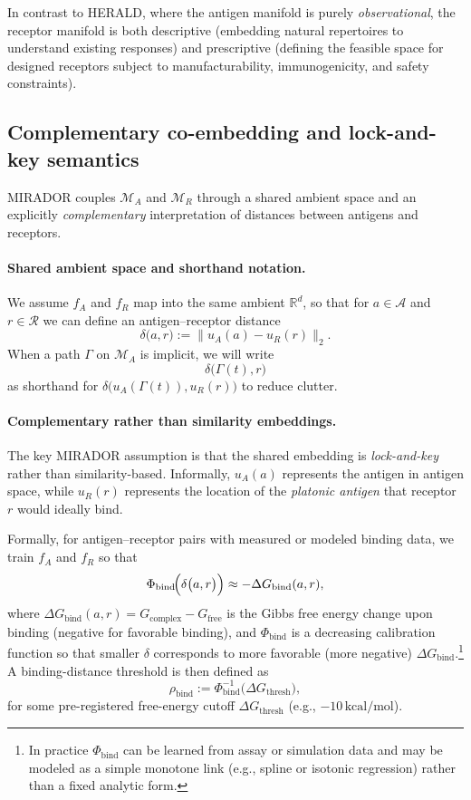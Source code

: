 \documentclass[11pt]{article}
\newcommand{\Rcal}{\mathcal{R}}
\newcommand{\M}{\mathcal{M}}
\newcommand{\Acal}{\mathcal{A}}
\begin{document}
In contrast to HERALD, where the antigen manifold is purely \emph{observational}, the receptor manifold is both descriptive (embedding natural repertoires to understand existing responses) and prescriptive (defining the feasible space for designed receptors subject to manufacturability, immunogenicity, and safety constraints).

\subsection{Complementary co-embedding and lock-and-key semantics}
\label{sec:mirror-geometry}

MIRADOR couples $\M_A$ and $\M_R$ through a shared ambient space and an explicitly \emph{complementary} interpretation of distances between antigens and receptors.

\paragraph{Shared ambient space and shorthand notation.}
We assume $f_A$ and $f_R$ map into the same ambient $\mathbb{R}^d$, so that for $a \in \Acal$ and $r \in \Rcal$ we can define an antigen--receptor distance
\[
  \delta\bigl(a, r\bigr) := \bigl\|u_A(a) - u_R(r)\bigr\|_2.
\]
When a path $\Gamma$ on $\M_A$ is implicit, we will write
\[
  \delta\bigl(\Gamma(t), r\bigr)
\]
as shorthand for $\delta\bigl(u_A(\Gamma(t)), u_R(r)\bigr)$ to reduce clutter.

\paragraph{Complementary rather than similarity embeddings.}
The key MIRADOR assumption is that the shared embedding is \emph{lock-and-key} rather than similarity-based. Informally, $u_A(a)$ represents the antigen in antigen space, while $u_R(r)$ represents the location of the \emph{platonic antigen} that receptor $r$ would ideally bind.

Formally, for antigen--receptor pairs with measured or modeled binding data, we train $f_A$ and $f_R$ so that
\[
  \Phi_{\mathrm{bind}}\!\Bigl(\delta\bigl(a,r\bigr)\Bigr)
  \approx -\Delta G_{\mathrm{bind}}(a,r),
\]
where $\Delta G_{\mathrm{bind}}(a,r) = G_{\mathrm{complex}} - G_{\mathrm{free}}$ is the Gibbs free energy change upon binding (negative for favorable binding), and $\Phi_{\mathrm{bind}}$ is a decreasing calibration function so that smaller $\delta$ corresponds to more favorable (more negative) $\Delta G_{\mathrm{bind}}$.\footnote{In practice $\Phi_{\mathrm{bind}}$ can be learned from assay or simulation data and may be modeled as a simple monotone link (e.g., spline or isotonic regression) rather than a fixed analytic form.}
A binding-distance threshold is then defined as
\[
  \rho_{\mathrm{bind}} := \Phi_{\mathrm{bind}}^{-1}\bigl(\Delta G_{\mathrm{thresh}}\bigr),
\]
for some pre-registered free-energy cutoff $\Delta G_{\mathrm{thresh}}$ (e.g., $-10\,\mathrm{kcal/mol}$).
\end{document}
